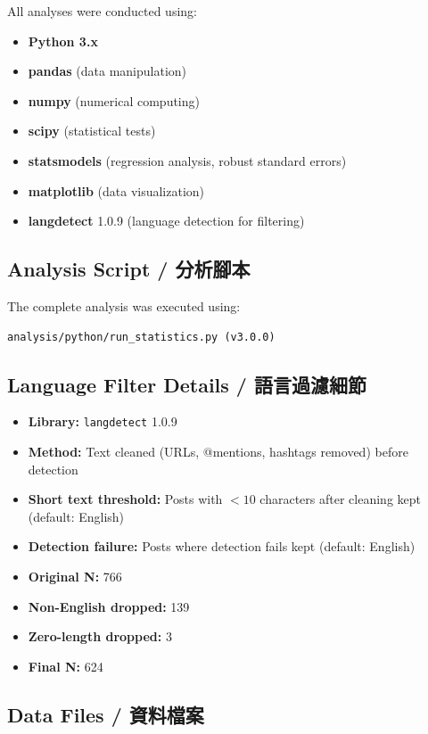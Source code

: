 \documentclass[12pt,a4paper]{article}
\begin{document}
All analyses were conducted using:
\begin{itemize}
    \item \textbf{Python 3.x}
    \item \textbf{pandas} (data manipulation)
    \item \textbf{numpy} (numerical computing)
    \item \textbf{scipy} (statistical tests)
    \item \textbf{statsmodels} (regression analysis, robust standard errors)
    \item \textbf{matplotlib} (data visualization)
    \item \textbf{langdetect} 1.0.9 (language detection for filtering)
\end{itemize}

\subsection{Analysis Script / 分析腳本}

The complete analysis was executed using:
\begin{verbatim}
analysis/python/run_statistics.py (v3.0.0)
\end{verbatim}

\subsection{Language Filter Details / 語言過濾細節}

\begin{itemize}
    \item \textbf{Library:} \texttt{langdetect} 1.0.9
    \item \textbf{Method:} Text cleaned (URLs, @mentions, hashtags removed) before detection
    \item \textbf{Short text threshold:} Posts with $< 10$ characters after cleaning kept (default: English)
    \item \textbf{Detection failure:} Posts where detection fails kept (default: English)
    \item \textbf{Original N:} 766
    \item \textbf{Non-English dropped:} 139
    \item \textbf{Zero-length dropped:} 3
    \item \textbf{Final N:} 624
\end{itemize}

\subsection{Data Files / 資料檔案}
\end{document}
